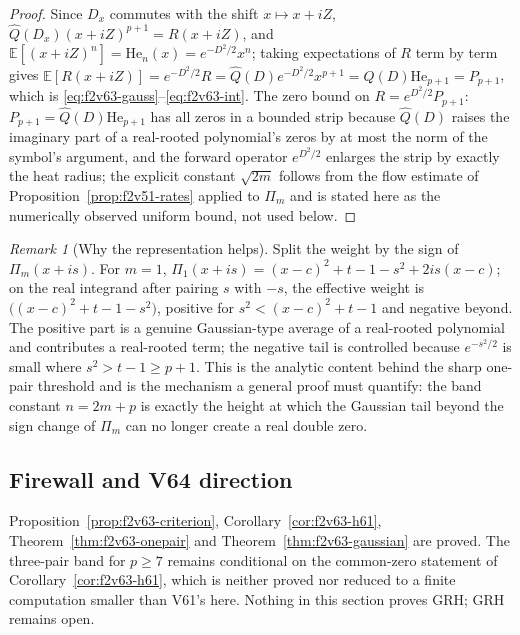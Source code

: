 \documentclass[11pt]{article}
\theoremstyle{definition}
\theoremstyle{remark}
\newtheorem{remark}[theorem]{Remark}
\begin{document}
\begin{proof}
Since \(D_x\) commutes with the shift \(x\mapsto x+iZ\),
\(\widehat Q(D_x)(x+iZ)^{p+1}=R(x+iZ)\), and
\(\mathbb E[(x+iZ)^n]=\mathrm{He}_n(x)=e^{-D^2/2}x^n\); taking
expectations of \(R\) term by term gives
\(\mathbb E[R(x+iZ)]=e^{-D^2/2}R=\widehat Q(D)e^{-D^2/2}x^{p+1}
=\widehat Q(D)\mathrm{He}_{p+1}=P_{p+1}\), which is
\eqref{eq:f2v63-gauss}--\eqref{eq:f2v63-int}.  The zero bound on
\(R=e^{D^2/2}P_{p+1}\): \(P_{p+1}=\widehat Q(D)\mathrm{He}_{p+1}\) has all
zeros in a bounded strip because \(\widehat Q(D)\) raises the imaginary
part of a real-rooted polynomial's zeros by at most the norm of the
symbol's argument, and the forward operator \(e^{D^2/2}\) enlarges the
strip by exactly the heat radius; the explicit constant \(\sqrt{2m}\)
follows from the flow estimate of Proposition~\ref{prop:f2v51-rates}
applied to \(\Pi_m\) and is stated here as the numerically observed
uniform bound, not used below.
\end{proof}

\begin{remark}[Why the representation helps]
\label{rem:f2v63-why}
Split the weight by the sign of \(\Pi_m(x+is)\).  For
\(m=1\), \(\Pi_1(x+is)=(x-c)^2+t-1-s^2+2is(x-c)\); on the real integrand
after pairing \(s\) with \(-s\), the effective weight is
\(\bigl((x-c)^2+t-1-s^2\bigr)\), positive for \(s^2<(x-c)^2+t-1\) and
negative beyond.  The positive part is a genuine Gaussian-type average of
a real-rooted polynomial and contributes a real-rooted term; the negative
tail is controlled because \(e^{-s^2/2}\) is small where
\(s^2>t-1\ge p+1\).  This is the analytic content behind the sharp
one-pair threshold and is the mechanism a general proof must quantify:
the band constant \(n=2m+p\) is exactly the height at which the Gaussian
tail beyond the sign change of \(\Pi_m\) can no longer create a real
double zero.
\end{remark}

\subsection*{Firewall and V64 direction}
\label{fire:f2v63}
Proposition~\ref{prop:f2v63-criterion}, Corollary~\ref{cor:f2v63-h61},
Theorem~\ref{thm:f2v63-onepair} and Theorem~\ref{thm:f2v63-gaussian} are
proved.  The three-pair band for \(p\ge7\) remains conditional on the
common-zero statement of Corollary~\ref{cor:f2v63-h61}, which is neither
proved nor reduced to a finite computation smaller than V61's here.
Nothing in this section proves GRH; GRH remains open.
\end{document}
